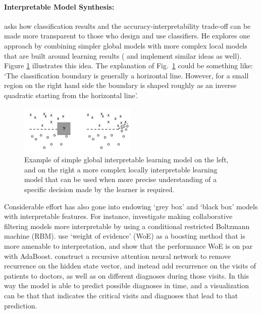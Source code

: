 \paragraph{Interpretable Model Synthesis:}
\citet{Ruping2006-xj} asks how classification results and the accuracy-interpretability trade-off can be made more transparent to those who design and use classifiers. He explores one approach by combining simpler global models with more complex local models that are built around learning results (\citet{Otte2013-oo} and \citet{Ribeiro2016-uc} implement similar ideas as well). 
Figure \ref{fig:ruping} illustrates this idea. 
The explanation of Fig.~\ref{fig:ruping} could be something like: `The classification boundary is generally a horizontal line. However, for a small region on the right hand side the boundary is shaped roughly as an inverse quadratic starting from the horizontal line'.

\begin{figure}[htbp]
    \centering
    \includegraphics[width=0.5\textwidth]{Figures/global_local}
    \caption{Example of simple global interpretable learning model on the left, and on the right a more complex locally interpretable learning model that can be used when more precise understanding of a specific decision made by the learner is required. }
    \label{fig:ruping}
\end{figure}

Considerable effort has also gone into endowing `grey box' and `black box' models with interpretable features. 
For instance, \citet{Abdollahi2016-vn} investigate making collaborative filtering models more interpretable by using a conditional restricted Boltzmann machine (RBM). \citet{Ridgeway1998-lv} use `weight of evidence' (WoE) as a boosting method that is more amenable to interpretation, and show that the performance WoE is on par with AdaBoost. \citet{Choi2016-by} construct a recursive attention neural network to remove recurrence on the hidden state vector, and instead add recurrence on the visits of patients to doctors, as well as on different diagnoses during those visits. In this way the model is able to predict possible diagnoses in time, and a visualization can be that that indicates the critical visits and diagnoses that lead to that prediction.

